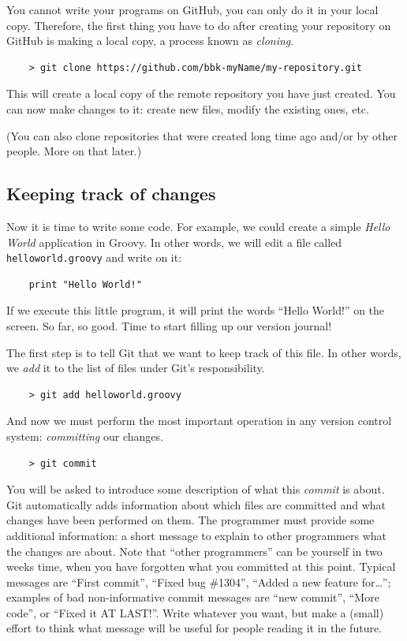 You cannot write your programs on GitHub, you can only do it in your
local copy. Therefore, the first thing you have to do after creating
your repository on GitHub is making a local copy, a process known as
\emph{cloning}. 

\begin{verbatim}
    > git clone https://github.com/bbk-myName/my-repository.git
\end{verbatim}

This will create a local copy of the remote repository you have just
created. You can now make changes to it: create new files, modify the
existing ones, etc.

(You can also clone repositories that were created long time ago and/or
by other people. More on that later.) 

\subsection{Keeping track of changes}
\label{sec:keep-track-chang}

Now it is time to write some code. For example, we could create a
simple \emph{Hello World} application in Groovy. In other words, we
will edit a file called \verb+helloworld.groovy+ and write on it:

\begin{verbatim}
    print "Hello World!"
\end{verbatim}

If we execute this little program, it will print the words ``Hello
World!'' on the screen. So far, so good. Time to start filling up our
version journal! 

The first step is to tell Git that we want to keep track of this
file. In other words, we \emph{add} it to the list of files under
Git's responsibility. 

\begin{verbatim}
    > git add helloworld.groovy
\end{verbatim}

And now we must perform the most important operation in any version control
system: \emph{committing} our changes. 

\begin{verbatim}
    > git commit
\end{verbatim}

You will be asked to introduce some description of what this \emph{commit}
is about. Git automatically adds information about which files are
committed and what changes have been performed on them. The programmer
must provide some additional information: a short message to explain
to other programmers what the changes are about. Note that ``other
programmers'' can be yourself in two weeks time, when you have
forgotten what you committed at this point. Typical messages are
``First commit'', ``Fixed bug \#1304'', ``Added a new feature
for\ldots''; examples of bad non-informative commit messages are ``new
commit'', ``More code'', or ``Fixed it AT LAST!''. Write whatever you
want, but make a (small) effort to think what message will be useful
for people reading it in the future.

